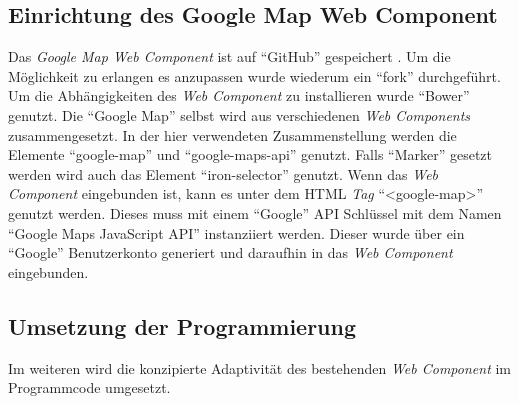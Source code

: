 \documentclass[12pt, paper=a4, bibtotoc, toc=listof, headsepline=true, numbers=endperiod]{scrreprt}
\begin{document}
	\subsection{Einrichtung des Google Map Web Component}
	Das \emph{Google Map Web Component} ist auf \enquote{GitHub} gespeichert \cite{gooMapGit}. Um die Möglichkeit zu erlangen es anzupassen wurde wiederum ein \enquote{fork} durchgeführt. Um die Abhängigkeiten des \emph{Web Component} zu installieren wurde \enquote{Bower} genutzt. Die \enquote{Google Map} selbst wird aus verschiedenen \emph{Web Components} zusammengesetzt. In der hier verwendeten Zusammenstellung werden die Elemente \enquote{google-map} und \enquote{google-maps-api} genutzt. Falls \enquote{Marker} gesetzt werden wird  auch das Element \enquote{iron-selector} genutzt. Wenn das \emph{Web Component} eingebunden ist, kann es unter dem \ac{HTML} \emph{Tag}  \enquote{<google-map>} genutzt werden. Dieses muss mit einem \enquote{Google} \ac{API} Schlüssel mit dem Namen \enquote{Google Maps JavaScript API} instanziiert werden. Dieser wurde über ein \enquote{Google} Benutzerkonto generiert und daraufhin in das \emph{Web Component} eingebunden. 
	\subsection{Umsetzung der Programmierung}
	Im weiteren wird die konzipierte Adaptivität des bestehenden \emph{Web Component} im Programmcode umgesetzt.
\end{document}
